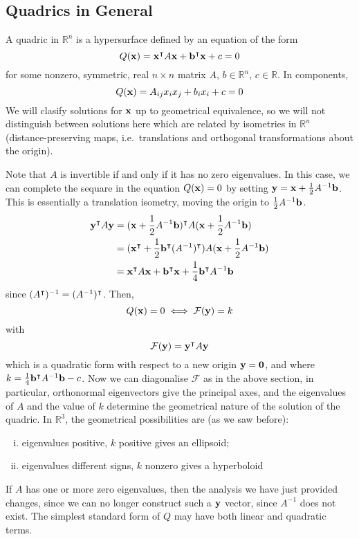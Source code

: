 \subsection{Quadrics in General}
A quadric in \(\mathbb R^n\) is a hypersurface defined by an equation of the form
\[
	Q(\vb x) = \vb x^\intercal A \vb x + \vb b^\intercal \vb x + c = 0
\]
for some nonzero, symmetric, real \(n \times n\) matrix \(A\), \(b \in \mathbb R^n\), \(c \in \mathbb R\).
In components,
\[
	Q(\vb x) = A_{ij}x_ix_j + b_ix_i + c = 0
\]
We will clasify solutions for \(\vb x\) up to geometrical equivalence, so we will not distinguish between solutions here which are related by isometries in \(\mathbb R^n\) (distance-preserving maps, i.e.\ translations and orthogonal transformations about the origin).

Note that \(A\) is invertible if and only if it has no zero eigenvalues.
In this case, we can complete the sequare in the equation \(Q(\vb x) = 0\) by setting \(\vb y = \vb x + \frac{1}{2}A^{-1} \vb b\).
This is essentially a translation isometry, moving the origin to \(\frac{1}{2}A^{-1} \vb b\).
\begin{align*}
	\vb y^\intercal A \vb y & = (\vb x + \frac{1}{2}A^{-1}\vb b)^\intercal A (\vb x + \frac{1}{2}A^{-1}\vb b)                         \\
	                         & = (\vb x^\intercal + \frac{1}{2}\vb b^\intercal(A^{-1})^\intercal) A (\vb x + \frac{1}{2}A^{-1}\vb b) \\
	                         & = \vb x^\intercal A \vb x + \vb b^\intercal \vb x + \frac{1}{4}\vb b^\intercal A^{-1}\vb b
\end{align*}
since \((A^\intercal)^{-1} = (A^{-1})^\intercal\).
Then,
\[
	Q(\vb x) = 0 \iff \mathcal F(\vb y) = k
\]
with
\[
	\mathcal F(\vb y) = \vb y^\intercal A \vb y
\]
which is a quadratic form with respect to a new origin \(\vb y = \vb 0\), and where \(k = \frac{1}{4}\vb b^\intercal A^{-1}\vb b - c\).
Now we can diagonalise \(\mathcal F\) as in the above section, in particular, orthonormal eigenvectors give the principal axes, and the eigenvalues of \(A\) and the value of \(k\) determine the geometrical nature of the solution of the quadric.
In \(\mathbb R^3\), the geometrical possibilities are (as we saw before):
\begin{enumerate}[(i)]
	\item eigenvalues positive, \(k\) positive gives an ellipsoid;
	\item eigenvalues different signs, \(k\) nonzero gives a hyperboloid
\end{enumerate}
If \(A\) has one or more zero eigenvalues, then the analysis we have just provided changes, since we can no longer construct such a \(\vb y\) vector, since \(A^{-1}\) does not exist.
The simplest standard form of \(Q\) may have both linear and quadratic terms.

